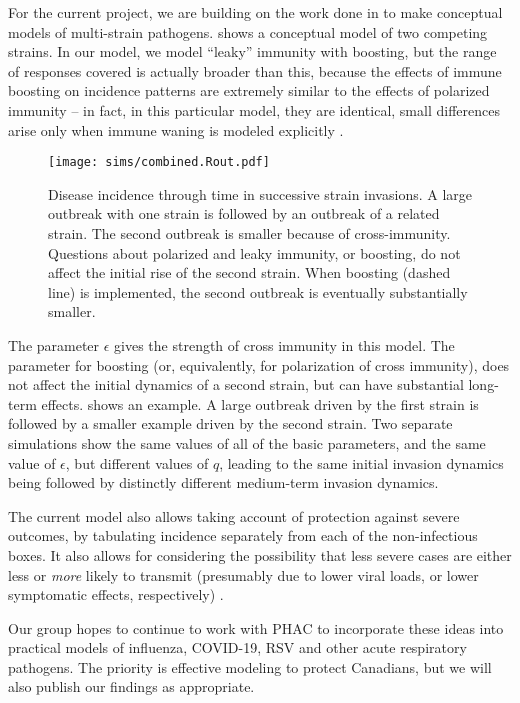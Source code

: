 For the current project, we are building on the work done in \cite{arcBoost} to make conceptual models of multi-strain pathogens.  shows a conceptual model of two competing strains. In our model, we model “leaky” immunity with boosting, but the range of responses covered is actually broader than this, because the effects of immune boosting on incidence patterns are extremely similar to the effects of polarized immunity – in fact, in this particular model, they are identical, small differences arise only when immune waning is modeled explicitly \cite{arcBoost}.

\begin{figure}
\texttt{[image: sims/combined.Rout.pdf]}

\caption{
	Disease incidence through time in successive strain invasions. A large outbreak with one strain is followed by an outbreak of a related strain. The second outbreak is smaller because of cross-immunity. Questions about polarized and leaky immunity, or boosting, do not affect the initial rise of the second strain. When boosting (dashed line) is implemented, the second outbreak is eventually substantially smaller.
}
\end{figure}

The parameter $\epsilon$ gives the strength of cross immunity in this model. The parameter for boosting (or, equivalently, for polarization of cross immunity), does not affect the initial dynamics of a second strain, but can have substantial long-term effects.  shows an example. A large outbreak driven by the first strain is followed by a smaller example driven by the second strain. Two separate simulations show the same values of all of the basic parameters, and the same value of $\epsilon$, but different values of $q$, leading to the same initial invasion dynamics being followed by distinctly different medium-term invasion dynamics.

The current model also allows taking account of protection against severe outcomes, by tabulating incidence separately from each of the non-infectious boxes. It also allows for considering the possibility that less severe cases are either less or \emph{more} likely to transmit (presumably due to lower viral loads, or lower symptomatic effects, respectively) \cite{ParisPaper}.


Our group hopes to continue to work with PHAC to incorporate these ideas into practical models of influenza, COVID-19, RSV and other acute respiratory pathogens. The priority is effective modeling to protect Canadians, but we will also publish our findings as appropriate.
